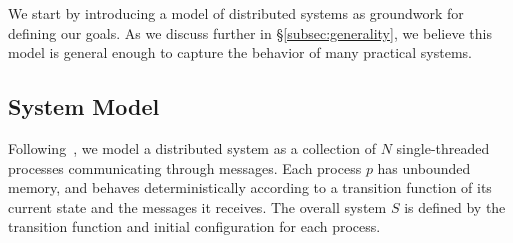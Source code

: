 
%
%

We start by introducing a model of distributed systems as
groundwork for defining our goals.
As we discuss further in \S\ref{subsec:generality},
we believe this model is general enough to capture the behavior of many
practical systems.

\subsection{System Model}

Following~\cite{Fischer:1985:IDC:3149.214121}, we model a distributed system as
a collection of $N$ single-threaded processes communicating through messages. Each process $p$ has unbounded
memory, and behaves deterministically according to a transition function of its current state and the messages it receives.
The overall system $S$ is defined by the transition function and initial
configuration for each process.

